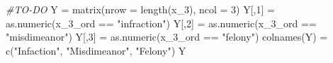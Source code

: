 \documentclass[
]{article}
\newenvironment{Shaded}{\begin{snugshade}}{\end{snugshade}}
\newcommand{\AttributeTok}[1]{\textcolor[rgb]{0.77,0.63,0.00}{#1}}
\newcommand{\CommentTok}[1]{\textcolor[rgb]{0.56,0.35,0.01}{\textit{#1}}}
\newcommand{\DecValTok}[1]{\textcolor[rgb]{0.00,0.00,0.81}{#1}}
\newcommand{\FunctionTok}[1]{\textcolor[rgb]{0.00,0.00,0.00}{#1}}
\newcommand{\NormalTok}[1]{#1}
\newcommand{\OtherTok}[1]{\textcolor[rgb]{0.56,0.35,0.01}{#1}}
\newcommand{\SpecialCharTok}[1]{\textcolor[rgb]{0.00,0.00,0.00}{#1}}
\newcommand{\StringTok}[1]{\textcolor[rgb]{0.31,0.60,0.02}{#1}}
\begin{document}
\begin{Shaded}
\begin{Highlighting}[]
\CommentTok{\#TO{-}DO}
\NormalTok{Y }\OtherTok{=} \FunctionTok{matrix}\NormalTok{(}\AttributeTok{nrow =} \FunctionTok{length}\NormalTok{(x\_3), }\AttributeTok{ncol =} \DecValTok{3}\NormalTok{)}
\NormalTok{Y[,}\DecValTok{1}\NormalTok{] }\OtherTok{=} \FunctionTok{as.numeric}\NormalTok{(x\_3\_ord }\SpecialCharTok{==} \StringTok{"infraction"}\NormalTok{)}
\NormalTok{Y[,}\DecValTok{2}\NormalTok{] }\OtherTok{=} \FunctionTok{as.numeric}\NormalTok{(x\_3\_ord }\SpecialCharTok{==} \StringTok{"misdimeanor"}\NormalTok{)}
\NormalTok{Y[,}\DecValTok{3}\NormalTok{] }\OtherTok{=} \FunctionTok{as.numeric}\NormalTok{(x\_3\_ord }\SpecialCharTok{==} \StringTok{"felony"}\NormalTok{)}
\FunctionTok{colnames}\NormalTok{(Y) }\OtherTok{=} \FunctionTok{c}\NormalTok{(}\StringTok{"Infaction"}\NormalTok{, }\StringTok{"Misdimeanor"}\NormalTok{, }\StringTok{"Felony"}\NormalTok{)}
\NormalTok{Y}
\end{Highlighting}
\end{Shaded}
\end{document}

